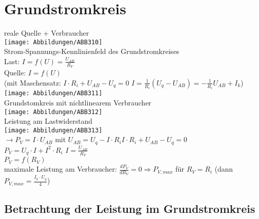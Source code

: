\documentclass{scrreprt}
\begin{document}
\section{Grundstromkreis}
reale Quelle + Verbraucher\\
\texttt{[image: Abbildungen/ABB310]}\\
Strom-Spannungs-Kennlinienfeld des Grundstromkreises\\
Last: $I=f(U)=\frac{U_{AB}}{R_V}$\\
Quelle: $I=f(U)$ \\
(mit Maschensatz: $I\cdot R_i + U_{AB}-U_q=0$ \qquad $I=\frac{1}{R_i}(U_q-U_{AB})=-\frac{1}{R_i}U_{AB}+I_k$)\\
\texttt{[image: Abbildungen/ABB311]}\\
Grundstomkreis mit nichtlinearem Verbraucher\\
\texttt{[image: Abbildungen/ABB312]}\\
Leistung am Lastwiderstand\\
\texttt{[image: Abbildungen/ABB313]}\\
$\rightarrow P_V = I\cdot U_{AB}$ \quad mit $U_{AB}=U_q-I\cdot R_i$\quad $I\cdot R_i + U_{AB}-U_q=0$\\
$P_V=U_q\cdot I + I^2 \cdot R_i$ \quad $I=\frac{U_{AB}}{R_V}$\\
$P_V=f(R_V)$\\
maximale Leistung am Verbraucher: $\frac{d P_V}{dR_V}=0 \Rightarrow P_{V,max}$ für $R_V=R_i$ (dann $P_{V,max}=\frac{I_k \cdot U_q}{4}$)

\subsection{Betrachtung der Leistung im Grundstromkreis}
\end{document}
